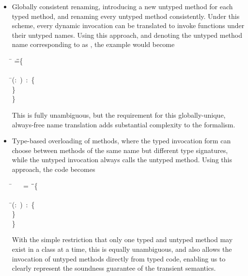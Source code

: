 \documentclass[USenglish]{tex/lipics-v2016}
\begin{document}
\begin{itemize}
  \item Globally consistent renaming, introducing a new untyped method for each
  typed method, and renaming every untyped method consistently. Under this scheme,
  every dynamic invocation can be translated to invoke functions under their untyped
  names. Using this approach, and denoting the untyped method name corresponding to \m as 
  \mp, the example would become


\begin{tabbing}
\hspace{1cm}\K\HS\=
 \HS\HS\HS\HS\HS\HS\HS\HS\HS\WHERE\HS
  \K\HS =\HS \= \class\= \C \{\\
\>        \> \HS \Mdef{\m}\\
\>\>\HS \=\mp(\x:~\any)~:~\any \{ \\
\>\>\>\HS\HS\HS\SubCast{} \HS\}\\
   \>    \> \}
\end{tabbing}

This is fully unambiguous, but the requirement for this globally-unique, always-free
name translation adds substantial complexity to the formalism.
\item Type-based overloading of methods, where the typed invocation form can choose
between methods of the same name but different type signatures, while the untyped
invocation always calls the untyped method. Using this approach, the code becomes


\begin{tabbing}
\hspace{1cm}\K\HS\=
 \HS\HS\HS\HS\HS\WHERE~
  \K ~=~ \= \class\= \C \{\\
\> \any\any \> \HS \Mdef{\m}\\
\>\>\HS \=\mp(\x:~\any)~:~\any \{ \\
\>\>\>\HS\HS\HS\SubCast{} \HS\}\\
   \>    \> \}
\end{tabbing}

With the simple restriction that only one typed and untyped method may
exist in a class at a time, this is equally unambiguous, and also allows
the invocation of untyped methods directly from typed code, enabling us
to clearly represent the soundness guarantee of the transient semantics.

\end{itemize}
\end{document}
